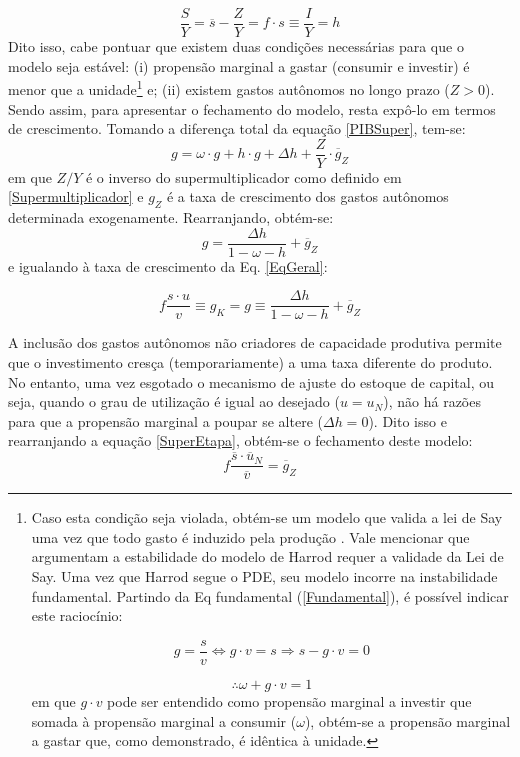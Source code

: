 \begin{equation}
\label{frac_h}
\frac{S}{Y} = \overline{s} - \frac{Z}{Y} = f\cdot s \equiv \frac{I}{Y} = h
\end{equation}
Dito isso, cabe pontuar que  existem duas condições necessárias para que o modelo seja estável: (i) propensão marginal a gastar (consumir e investir) é menor que a unidade\footnote{
	Caso esta condição seja violada, obtém-se um modelo que valida a lei de Say uma vez que todo gasto é induzido pela produção \cite[p.~ 75]{serrano_sraffian_1995}.
	Vale mencionar que \textcite{serrano_trouble_2017} argumentam a estabilidade do modelo de Harrod requer a validade da Lei de Say. Uma vez que Harrod segue o PDE, seu modelo incorre na instabilidade fundamental. Partindo da Eq fundamental (\ref{Fundamental}), é possível indicar este raciocínio:
	
	$$
	g = \frac{s}{v} \Leftrightarrow g\cdot v = s \Rightarrow s - g\cdot v = 0
	$$
	
	$$
	\therefore \omega + g\cdot v = 1
	$$
	em que $g\cdot v$ pode ser entendido como propensão marginal a investir que somada à propensão marginal a consumir ($\omega$), obtém-se a propensão marginal a gastar que, como demonstrado, é idêntica à unidade.
} e; (ii) existem gastos autônomos no longo prazo ($Z > 0$).
Sendo assim, para apresentar o fechamento do modelo, resta expô-lo em termos de crescimento.
Tomando a diferença total da equação \ref{PIBSuper}, tem-se:
$$
g = \omega\cdot g + h\cdot g + \Delta h + \frac{Z}{Y}\cdot \overline g_Z
$$
em que $Z/Y$ é o inverso do supermultiplicador como definido em \ref{Supermultiplicador} e $g_Z$ é a taxa de crescimento dos gastos autônomos determinada exogenamente. Rearranjando, obtém-se:
\begin{equation}
\label{crescimentosuper}
g = \frac{\Delta h}{1 - \omega - h} + \overline g_Z
\end{equation}
e igualando à taxa de crescimento da Eq. \ref{EqGeral}:

\begin{equation}
\label{SuperEtapa}
f\frac{s\cdot u}{v} \equiv g_K = g \equiv \frac{\Delta h}{1 - \omega - h} + \overline g_Z
\end{equation}


A inclusão dos gastos autônomos não criadores de capacidade produtiva permite que o investimento cresça (temporariamente) a uma taxa diferente do produto.
No entanto, uma vez esgotado o mecanismo de ajuste do estoque de capital, ou seja, quando o grau de utilização é igual ao desejado ($u = u_N$), não há razões para que a propensão marginal a poupar se altere ($\Delta h = 0$). 
Dito isso e rearranjando a equação \ref{SuperEtapa}, obtém-se o fechamento deste modelo:
$$
f\frac{\overline s\cdot \overline u_N}{\overline v} = \overline g_Z
$$

